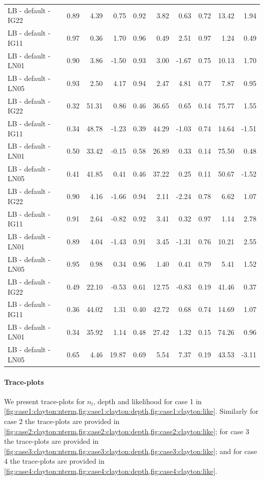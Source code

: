 \documentclass{amsart}
\begin{document}
\begin{table}[ht]
{\begin{tabular}{l|crr|crr|crr}
			\midrule
			LB - default - IG22 & 0.89 & 4.39 & 0.75 & 0.92 & 3.82 & 0.63 & 0.72 & 13.42 & 1.94 \\ 
			LB - default - IG11 & 0.97 & 0.36 & 1.70 & 0.96 & 0.49 & 2.51 & 0.97 & 1.24 & 0.49 \\ 
			LB - default - LN01 & 0.90 & 3.86 & -1.50 & 0.93 & 3.00 & -1.67 & 0.75 & 10.13 & 1.70 \\ 
			LB - default - LN05 & 0.93 & 2.50 & 4.17 & 0.94 & 2.47 & 4.81 & 0.77 & 7.87 & 0.95 \\ 
			\midrule
			LB - default - IG22 & 0.32 & 51.31 & 0.86 & 0.46 & 36.65 & 0.65 & 0.14 & 75.77 & 1.55 \\ 
			LB - default - IG11 & 0.34 & 48.78 & -1.23 & 0.39 & 44.29 & -1.03 & 0.74 & 14.64 & -1.51 \\ 
			LB - default - LN01 & 0.50 & 33.42 & -0.15 & 0.58 & 26.89 & 0.33 & 0.14 & 75.50 & 0.48 \\ 
			LB - default - LN05 & 0.41 & 41.85 & 0.41 & 0.46 & 37.22 & 0.25 & 0.11 & 50.67 & -1.52 \\ 
			\midrule
			LB - default - IG22 & 0.90 & 4.16 & -1.66 & 0.94 & 2.11 & -2.24 & 0.78 & 6.62 & 1.07 \\ 
			LB - default - IG11 & 0.91 & 2.64 & -0.82 & 0.92 & 3.41 & 0.32 & 0.97 & 1.14 & 2.78 \\ 
			LB - default - LN01 & 0.89 & 4.04 & -1.43 & 0.91 & 3.45 & -1.31 & 0.76 & 10.21 & 2.55 \\ 
			LB - default - LN05 & 0.95 & 0.98 & 0.34 & 0.96 & 1.40 & 0.41 & 0.79 & 5.41 & 1.52 \\ 
			\midrule
			LB - default - IG22 & 0.49 & 22.10 & -0.53 & 0.61 & 12.75 & -0.83 & 0.19 & 41.46 & 0.37 \\ 
			LB - default - IG11 & 0.36 & 44.02 & 1.31 & 0.40 & 42.72 & 0.68 & 0.74 & 14.69 & 1.07 \\ 
			LB - default - LN01 & 0.34 & 35.92 & 1.14 & 0.48 & 27.42 & 1.32 & 0.15 & 74.26 & 0.96 \\ 
			LB - default - LN05 & 0.65 & 4.46 & 19.87 & 0.69 & 5.54 & 7.37 & 0.19 & 43.53 & -3.11 \\ 
			\bottomrule
	\end{tabular}}
\end{table}


\paragraph{Trace-plots} We present trace-plots for $n_l$, depth and likelihood for case 1 in \cref{fig:case1:clayton:nterm,fig:case1:clayton:depth,fig:case1:clayton:like}. Similarly for case 2 the trace-plots are provided in \cref{fig:case2:clayton:nterm,fig:case2:clayton:depth,fig:case2:clayton:like}; for case 3 the trace-plots are provided in \cref{fig:case3:clayton:nterm,fig:case3:clayton:depth,fig:case3:clayton:like}; and for case 4 the trace-plots are provided in \cref{fig:case4:clayton:nterm,fig:case4:clayton:depth,fig:case4:clayton:like}.
\end{document}
